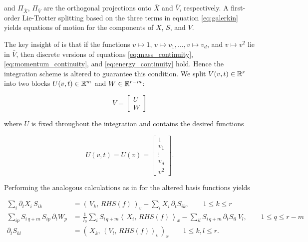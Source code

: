 and $\Pi_{\bar{X}}$, $\Pi_{\bar{V}}$ are the orthogonal projections onto $\bar{X}$ and 
$\bar{V}$, respectively. A first-order Lie-Trotter splitting based on the three terms in 
equation \ref{eq:galerkin} yields equations of motion for the components of $X$, $S$, 
and $V$. 

The key insight of \cite{einkemmer2021}
is that if the functions $v \mapsto 1$, $v \mapsto v_1, \ldots, v \mapsto v_d$, and 
$v \mapsto v^2$ lie in $\bar{V}$, then discrete versions of equations 
\ref{eq:mass_continuity}, \ref{eq:momentum_continuity}, and \ref{eq:energy_continuity} 
hold. Hence the integration scheme is altered to guarantee this condition. We split 
$V (v, t) \in \mathbb{R}^r$ into two blocks $U(v, t) \in \mathbb{R}^m$ and $W \in \mathbb{R}^{r-m}$: 

\begin{equation}
    V = \begin{bmatrix}
        U \\
        W
    \end{bmatrix}
\end{equation}

where $U$ is fixed throughout the integration and contains the desired functions

\begin{equation}
    U(v, t) = U(v) = \begin{bmatrix}
        1 \\
        v_1 \\
        \vdots \\
        v_d \\
        v^2
    \end{bmatrix} . 
\end{equation}

Performing the analogous calculations as in \cite{einkemmer2018}
for the altered basis functions yields \cite{einkemmer2021}

\begin{align}
    \sum_i \partial_t X_i\, S_{i k} &= 
        (\,V_k,\, RHS(f)\,)_v - \sum_i X_i\, \partial_t S_{i k} ,
        \quad\quad 1 \leq k \leq r \label{eq:X_galerkin}\\
    \sum_{i p} S_{i\, q+m}\, S_{i p}\, \partial_t W_p &= 
        \frac{1}{f_0} \sum_i S_{i\, q+m} \left\langle\, X_i,\, RHS(f) \,\right\rangle_x 
        - \sum_{i l} S_{i\, q+m}\, \partial_t S_{i l}\, V_l ,
        \quad\quad 1 \leq q \leq r - m \label{eq:V_galerkin}\\
    \partial_t S_{k l} &= \left( \,X_k,\, ( V_l,\, RHS(f) )_v\, \right)_x 
        \quad\quad 1 \leq k, l \leq r . \label{eq:S_galerkin}
\end{align}

